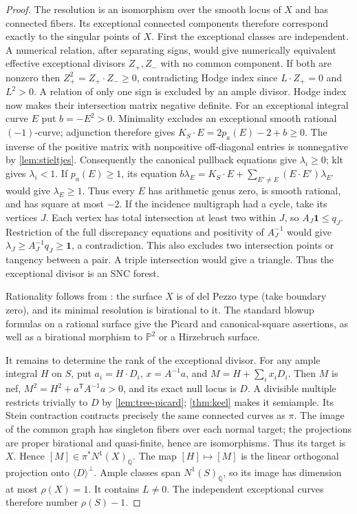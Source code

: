 \documentclass[11pt,reqno]{amsart}
\theoremstyle{definition}
\theoremstyle{remark}
\newcommand{\PP}{\mathbb P}
\newcommand{\QQ}{\mathbb Q}
\numberwithin{equation}{section}
\begin{document}
\begin{proof}
The resolution is an isomorphism over the smooth locus of $X$ and
has connected fibers. Its exceptional connected components therefore
correspond exactly to the singular points of $X$.
First the exceptional classes are independent. A numerical relation,
after separating signs, would give numerically equivalent effective
exceptional divisors $Z_+,Z_-$ with no common component. If both are
nonzero then $Z_+^2=Z_+\cdot Z_-\ge0$, contradicting Hodge index since
$L\cdot Z_+=0$ and $L^2>0$. A relation of only one sign is excluded by
an ample divisor. Hodge index now makes their intersection matrix
negative definite. For an exceptional integral curve $E$ put $b=-E^2>0$.
Minimality excludes an exceptional smooth rational $(-1)$-curve;
adjunction therefore gives $K_S\cdot E=2p_a(E)-2+b\ge0$.
The inverse of the positive matrix with nonpositive off-diagonal
entries is nonnegative by \cref{lem:stieltjes}. Consequently the
canonical pullback equations give $\lambda_i\ge0$; klt gives
$\lambda_i<1$. If $p_a(E)\ge1$, its equation
$b\lambda_E=K_S\cdot E+\sum_{E'\ne E}(E\cdot E')\lambda_{E'}$
would give $\lambda_E\ge1$. Thus every $E$ has arithmetic genus zero,
is smooth rational, and has square at most $-2$.
If the incidence multigraph had a cycle, take its vertices $J$.
Each vertex has total intersection at least two within $J$, so
$A_J\mathbf1\le q_J$. Restriction of the full discrepancy equations
and positivity of $A_J^{-1}$ would give
$\lambda_J\ge A_J^{-1}q_J\ge\mathbf1$, a contradiction.
This also excludes two intersection points or tangency between a pair.
A triple intersection would give a triangle. Thus the exceptional
divisor is an SNC forest.

Rationality follows from \cite[Lemma~5.1]{Bernasconi}: the surface $X$
is of del Pezzo type (take boundary zero), and its minimal resolution
is birational to it. The standard blowup formulas on a rational surface
give the Picard and canonical-square assertions, as well as a birational
morphism to $\PP^2$ or a Hirzebruch surface.

It remains to determine the rank of the exceptional divisor. For any ample integral $H$ on $S$,
put $a_i=H\cdot D_i$, $x=A^{-1}a$, and $M=H+\sum_i x_iD_i$.
Then $M$ is nef, $M^2=H^2+a^{\mathsf T}A^{-1}a>0$, and its exact
null locus is $D$. A divisible multiple restricts trivially to $D$
by \cref{lem:tree-picard}; \cref{thm:keel} makes it semiample.
Its Stein contraction contracts precisely the same connected curves
as $\pi$. The image of the common graph has singleton fibers over each
normal target; the projections are proper birational and quasi-finite,
hence are isomorphisms. Thus its target is $X$.
Hence $[M]\in\pi^*N^1(X)_{\QQ}$.
The map $[H]\mapsto[M]$ is the linear orthogonal projection onto
$\langle D\rangle^\perp$. Ample classes span $N^1(S)_{\QQ}$, so its
image has dimension at most $\rho(X)=1$. It contains $L\ne0$.
The independent exceptional curves therefore number $\rho(S)-1$.
\end{proof}
\end{document}
